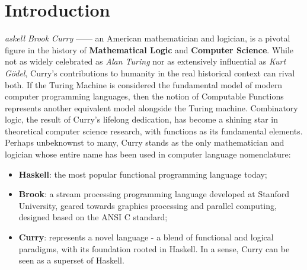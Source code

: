 \newpage
\section{Introduction}
\lettrine[findent=2pt]{}{ }\textit{askell Brook Curry} —— an American mathematician and logician, is a pivotal figure in the history of \textbf{Mathematical Logic} and \textbf{Computer Science}. 
While not as widely celebrated as \textit{Alan Turing}\cite{alan-turing} nor as extensively influential as \textit{Kurt Gödel}\cite{godel}, Curry's contributions to humanity in the real historical context can rival both. 
If the Turing Machine\cite{turing-machine} is considered the fundamental model of modern computer programming languages, then the notion of Computable Functions\cite{computable-function} represents another equivalent model alongside the Turing machine. 
Combinatory logic\cite{combinational-logic}, the result of Curry's lifelong dedication, has become a shining star in theoretical computer science research, with functions as its fundamental elements. 
Perhaps unbeknownst to many, Curry stands as the only mathematician and logician whose entire name has been used in computer language nomenclature: 
\begin{itemize}[label={}, leftmargin=1em, itemsep=0.5em]
    \item \textbf{Haskell}: the most popular functional programming language today; 
    \item \textbf{Brook}: a stream processing programming language developed at Stanford University, geared towards graphics processing and parallel computing, designed based on the ANSI C standard; 
    \item \textbf{Curry}: represents a novel language - a blend of functional and logical paradigms, with its foundation rooted in Haskell. In a sense, Curry can be seen as a superset of Haskell. 
\end{itemize}